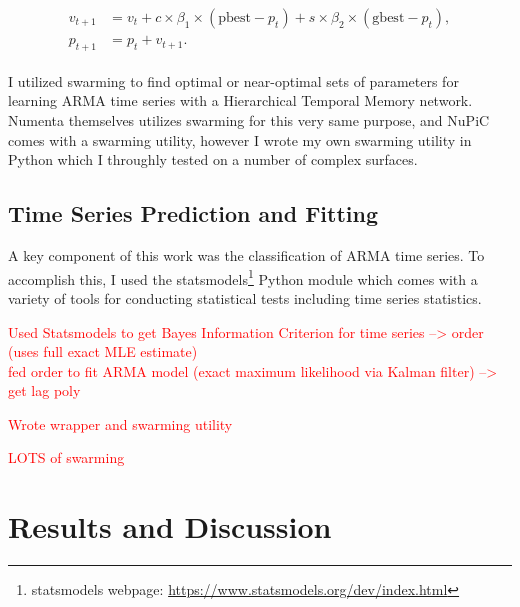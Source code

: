\documentclass[oneside,12pt,openany]{book}
\begin{document}
	\begin{align}
	\label{eqn:psoupdate}
	\begin{split}
	v_{t+1} &= v_{t}+c\times \beta_{1} \times (\text{pbest}-p_{t})+s\times \beta_{2} \times (\text{gbest}-p_{t}), \\
	p_{t+1} &= p_{t} + v_{t+1} .
	\end{split}
	\end{align}

	I utilized swarming to find optimal or near-optimal sets of parameters for learning ARMA time series with a Hierarchical Temporal Memory network. Numenta themselves utilizes swarming for this very same purpose, and NuPiC comes with a swarming utility, however I wrote my own swarming utility in Python which I throughly tested on a number of complex surfaces.
	
	\section{Time Series Prediction and Fitting}

	A key component of this work was the classification of ARMA time series. To accomplish this, I used the statsmodels\footnote{statsmodels webpage: \href{https://www.statsmodels.org/dev/index.html}{https://www.statsmodels.org/dev/index.html}} Python module which comes with a variety of tools for conducting statistical tests including time series statistics. 
	
	\textcolor{red}{Used Statsmodels to get Bayes Information Criterion for time series --> order (uses full exact MLE estimate) \\ fed order to fit ARMA model (exact maximum likelihood via Kalman filter) --> get lag poly }

	
	\textcolor{red}{Wrote wrapper and swarming utility}
	
	\textcolor{red}{LOTS of swarming}
	
	\chapter{Results and Discussion}
	
\end{document}
